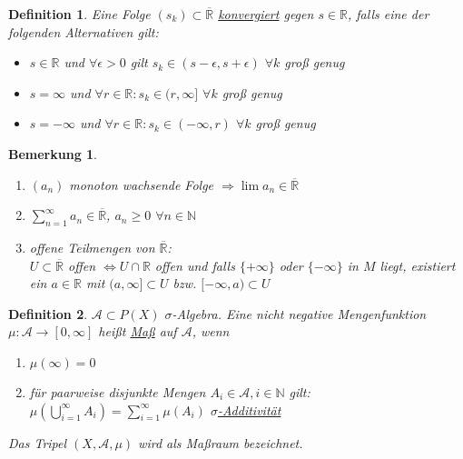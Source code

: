\documentclass[11pt]{memoir}
\theoremstyle{break}
\newtheorem{Definition}{Definition}[chapter]
\newtheorem{Bemerkung}{Bemerkung}[chapter]
\begin{document}
\begin{Definition}
Eine Folge $(s_{k}) \subset \overline{\mathbb{R}}$ \underline{konvergiert} gegen $s \in \mathbb{R}$, falls eine der folgenden Alternativen gilt:
\begin{itemize}
	\item  $s \in \mathbb{R}$ und $\forall \epsilon > 0$ gilt $s_{k} \in (s-\epsilon, s+\epsilon)$ $\forall k$ groß genug
	\item $s = \infty$ und $\forall r \in \mathbb{R}: s_{k} \in (r, \infty]$ $\forall k$ groß genug
	\item $s = -\infty$ und $\forall r \in \mathbb{R}: s_k \in (-\infty, r)$ $\forall k$ groß genug
\end{itemize}
\end{Definition}

\begin{Bemerkung}
\begin{enumerate}
	\item $(a_n)$ monoton wachsende Folge
	$\Rightarrow \lim a_n \in \mathbb{\overline{R}}$
	\item $\sum\limits_{n=1}^{\infty} a_n \in \mathbb{\overline{R}}$, $a_n \geq 0$ $ \forall n \in \mathbb{N}$
	\item offene Teilmengen von $\overline{\mathbb{R}}$: \\
	$U \subset \overline{\mathbb{R}} $ offen $\Leftrightarrow U \cap \mathbb{R}$ offen und falls $\{+\infty\}$ oder $\{-\infty\}$ in $M$ liegt, existiert ein $a \in \mathbb{R}$ mit $(a,{} \infty ]\subset U$ bzw. $[-\infty, a) \subset U$
\end{enumerate}
\end{Bemerkung}

\begin{Definition}
$\mathscr{A} \subset P(X)$ $\sigma$-Algebra. Eine nicht negative Mengenfunktion $\mu: \mathscr{A} \rightarrow [0, \infty]$ heißt \underline{Maß} auf $\mathscr{A}$, wenn
\begin{enumerate}
	\item $\mu(\infty) = 0$
	\item für paarweise disjunkte Mengen $A_i \in \mathscr{A}, i \in \mathbb{N}$ gilt: \\
	$\mu(\bigcup\limits_{i=1}^{\infty}A_i) = \sum\limits_{i=1}^{\infty} \mu(A_i)$ \underline{$\sigma$-Additivität}
\end{enumerate}
Das Tripel $(X, \mathscr{A}, \mu)$ wird als Maßraum bezeichnet.
\end{Definition}
\end{document}

